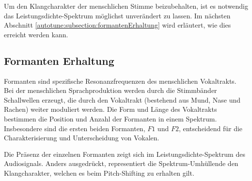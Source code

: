 
Um den Klangcharakter der menschlichen Stimme beizubehalten,
ist es notwendig das Leistungsdichte-Spektrum möglichst unverändert zu lassen.
Im nächsten Abschnitt \ref{autotune:subsection:formantenErhaltung} wird erläutert, wie dies erreicht werden kann.


\subsection{Formanten Erhaltung
\label{autotune:subsection:formantenErhaltung}}
Formanten sind spezifische Resonanzfrequenzen des menschlichen Vokaltrakts.
Bei der menschlichen Sprachproduktion werden durch die Stimmbänder Schallwellen erzeugt,
die durch den Vokaltrakt (bestehend aus Mund, Nase und Rachen) weiter moduliert werden.
Die Form und Länge des Vokaltrakts bestimmen die Position und Anzahl der Formanten in einem Spektrum. 
Insbesondere sind die ersten beiden Formanten, $F1$ und $F2$,
entscheidend für die Charakterisierung und Unterscheidung von Vokalen.

Die Präsenz der einzelnen Formanten zeigt sich im Leistungsdichte-Spektrum des Audiosignals.
Anders ausgedrückt, representiert die Spektrum-Umhüllende den Klangcharakter, welchen es beim Pitch-Shifting zu erhalten gilt.


